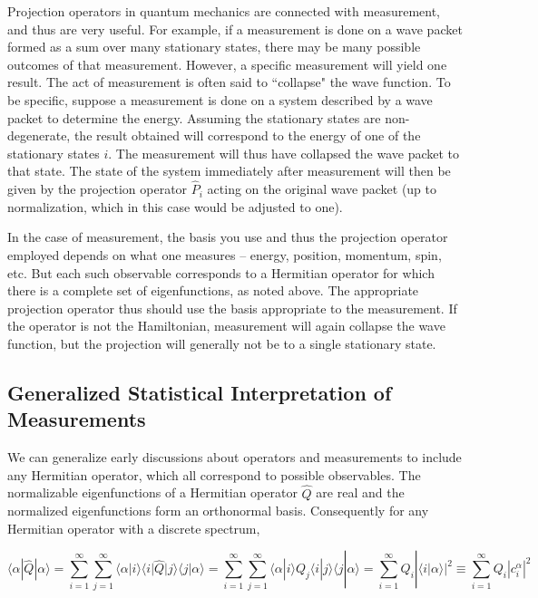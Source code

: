 Projection operators in quantum mechanics are connected with measurement, and thus are very
useful. For example, if a measurement is done on a wave packet formed as a sum
over many stationary states, there may be many possible outcomes of that
measurement. However, a specific
measurement will yield one result. The act of measurement is often said to
``collapse" the wave function. To be specific, suppose a measurement is done on
a system described by a wave packet to determine the energy. Assuming the
stationary states are non-degenerate, the result obtained will correspond to
the energy of one of the stationary states $i$. The measurement will thus have
collapsed the wave packet to that state. The state of the system immediately
after measurement will then be given by the projection operator $\hat{P}_i$
acting on the original wave packet (up to normalization, which in this case
would be adjusted to one).

In the case of measurement, the basis you use and thus the projection operator
employed depends on what one measures -- energy, position, momentum, spin,
etc. But each such observable
corresponds to a Hermitian operator for which there is a complete set of eigenfunctions, as noted
above. The appropriate projection operator thus should use the basis
appropriate to the measurement. If the operator is not the Hamiltonian,
measurement will again collapse the wave function,
but the projection will generally not be to a single stationary state.


\subsection{Generalized Statistical Interpretation of Measurements} 


We can generalize early discussions about operators and measurements to include
any Hermitian operator, which all correspond to possible observables. The
normalizable eigenfunctions of a Hermitian operator $\hat{Q}$ are real and the
normalized eigenfunctions form an orthonormal basis. Consequently for any
Hermitian operator with a discrete spectrum, 

\[
\langle \alpha | \hat{Q} | \alpha \rangle = \sum_{i=1}^{\infty}
\sum_{j=1}^{\infty} \langle \alpha | i\rangle \langle i | \hat{Q} | j\rangle
\langle j | \alpha \rangle = \sum_{i=1}^{\infty} \sum_{j=1}^{\infty} \langle
\alpha | i \rangle Q_j \langle i | j \rangle \langle j | \alpha \rangle
= \sum_{i=1}^{\infty} Q_i | \langle i | \alpha \rangle|^2 \equiv
\sum_{i=1}^{\infty} Q_i |c_i^\alpha |^2  
\] \vspace{3px}

